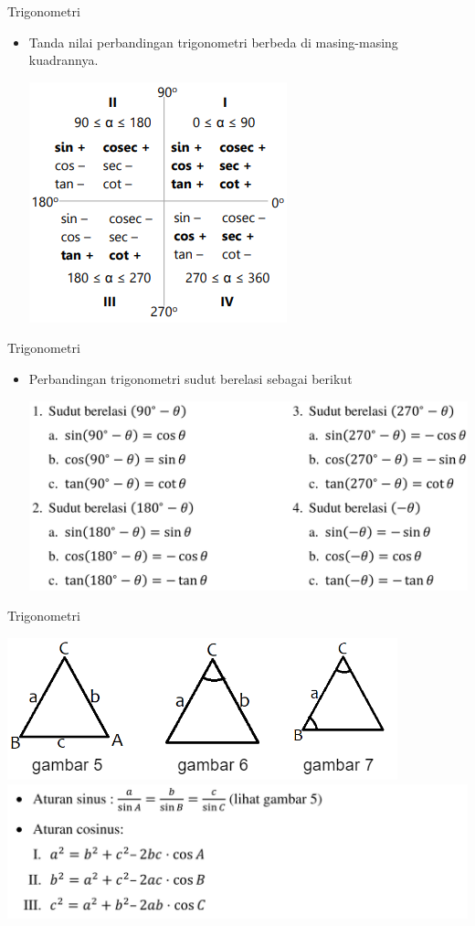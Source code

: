 \documentclass[pdflatex,compress,mathserif]{beamer}
\begin{document}
	\begin{frame}{Trigonometri}
		\begin{itemize}
			\item Tanda nilai perbandingan trigonometri berbeda di masing-masing kuadrannya.
			\begin{center}
				\includegraphics[width=0.5\linewidth]{pict/24}
			\end{center}
		\end{itemize}
	\end{frame}

	\begin{frame}{Trigonometri}
		\begin{itemize}
			\item Perbandingan trigonometri sudut berelasi sebagai berikut
			\begin{center}
				\includegraphics[width=\linewidth]{pict/25}
			\end{center}
		\end{itemize}
	\end{frame}

	\begin{frame}{Trigonometri}
		\begin{center}
			\includegraphics[width=0.5\linewidth]{pict/26}
			\includegraphics[width=0.9\linewidth]{pict/27}
		\end{center}
	\end{frame}
	
\end{document}
